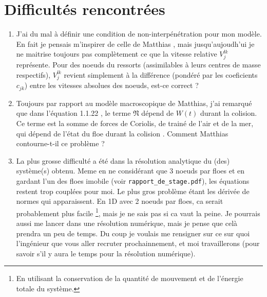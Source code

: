 \documentclass[
  french,
	11pt, %
]{fphw}
\begin{document}
\section*{Difficultés rencontrées}

\begin{enumerate}
  \item J'ai du mal à définir une condition de non-interpénétration pour mon modèle. En fait je pensais m'inspirer de celle de Matthias \parencite[p.32]{rabatel2015thesis}, mais jusqu'aujoudh'ui je ne maitrise toujours pas complètement ce que la vitesse relative $V^{lk}_j$ représente. Pour des noeuds du ressorts (assimilables à leurs centres de masse respectifs), $V^{lk}_j$ revient simplement à la différence (pondéré par les coeficients $c_{jk}$) entre les vitesses absolues des noeuds, est-ce correct ? 
  \item Toujours par rapport au modèle macroscopique de Matthias, j'ai remarqué que dans l'équation 1.1.22 \parencite[p.35]{rabatel2015thesis}, le terme $\mathfrak{N}$ dépend de $W(t)$ durant la colision. Ce terme est la somme de forces de Coriolis, de trainé de l'air et de la mer, qui dépend de l'état du floe durant la colision \parencite[p.49]{rabatel2015thesis}. Comment Matthias contourne-t-il ce problème ?
  \item La plus grosse difficulté a été dans la résolution analytique du (des) système(s) obtenu. Meme en ne considérant que 3 noeuds par floes et en gardant l'un des floes imobile (voir \verb|rapport_de_stage.pdf|), les équations restent trop couplées pour moi. Le plus gros problème étant les dérivée de normes qui apparaissent. En 1D avec 2 noeuds par floes, ca serait probablement plus facile \footnote{En utilisant la conservation de la quantité de mouvement et de l'énergie totale du système.}, mais je ne sais pas si ca vaut la peine. Je pourrais aussi me lancer dans une résolution numérique, mais je pense que celà prendra un peu de temps. Du coup je voulais me rensigner sur ce sur quoi l'ingénieur que vous aller recruter prochainnement, et moi travaillerons (pour savoir s'il y aura le temps pour la résolution numérique). 
\end{enumerate}





\clearpage   %
\printbibliography
\end{document}
